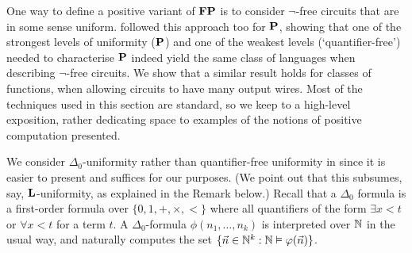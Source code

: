 \documentclass{lmcs}
\begin{document}


One way to define a positive variant of $\mathbf{FP}$ is to consider $\neg$-free circuits that are in some sense uniform.
\cite{LautemannSS96:on-pos-p,LSS98} followed this approach too for $\mathbf{P}$, showing that one of the strongest levels of uniformity ($\mathbf{P}$) and one of the weakest levels (`quantifier-free') needed to characterise $\mathbf{P}$ indeed yield the same class of languages when describing $\neg$-free circuits.
We show that a similar result holds for classes of functions, when allowing circuits to have many output wires.
Most of the techniques used in this section are standard, so we keep to a high-level exposition, rather dedicating space to examples of the notions of positive computation presented.

We consider $\Delta_0$-uniformity rather than quantifier-free uniformity in \cite{LautemannSS96:on-pos-p,LSS98} since it is easier to present and suffices for our purposes.
(We point out that this subsumes, say, $\mathbf{L}$-uniformity, as explained in the Remark below.)
Recall that a $\Delta_0$ formula is a first-order formula over $\{ 0,1,+,\times, <  \}$ where all quantifiers of the form $\exists x < t$ or $\forall x < t$ for a term $t$.
A $\Delta_0$-formula $\phi(n_1 , \dots , n_k)$ is interpreted over $\mathbb{N} $ in the usual way, and naturally computes the set $\{\vec n \in \mathbb{N}^k : \mathbb{N} \vDash \varphi (\vec n) \}$.



\end{document}
